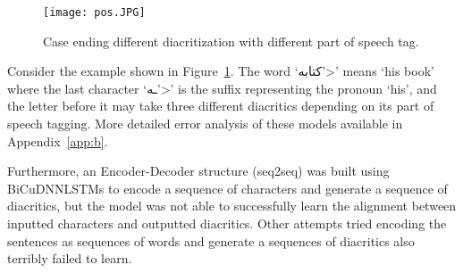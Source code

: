 \documentclass[11pt,a4paper]{article}
\begin{document}
\begin{table*}[h]
\centering
\caption{Comparing the BNG model with \cite{belinkov2015arabic} in terms of DER/WER on the test set}
\label{tab:belinkov_derwer_original_testset}
\end{table*}

\begin{figure}[h]
    \centering
    \texttt{[image: pos.JPG]}
    \caption{Case ending different diacritization with different part of speech tag.}
    \label{fig:pos}
\end{figure}

Consider the example shown in Figure~\ref{fig:pos}. The word
`\<كتابه’>'
means `his book' where the last character
`\<ـه’>'
is the suffix representing the pronoun `his', and the letter before it may take three different diacritics depending on its part of speech tagging.
More detailed error analysis of these models available in Appendix~\ref{app:b}.

Furthermore, an Encoder-Decoder structure (seq2seq) was built using BiCuDNNLSTMs to encode a sequence of characters and generate a sequence of diacritics, but the model was not able to successfully learn the alignment between inputted characters and outputted diacritics. Other attempts tried encoding the sentences as sequences of words and generate a sequences of diacritics also terribly failed to learn.
\end{document}
